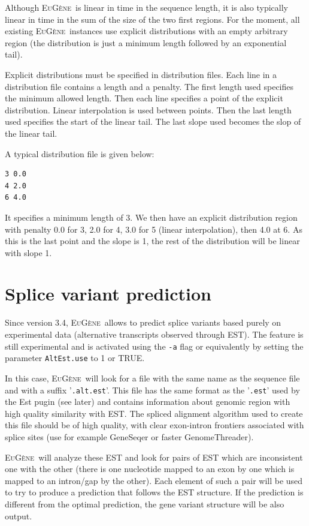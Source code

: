 \documentclass[a4paper,titlepage]{report}
\newcommand{\EuGene}{\textsc{EuG\`ene}}
\begin{document}
Although \EuGene\ is linear in time in the sequence length, it is also
typically linear in time in the sum of the size of the two first
regions. For the moment, all existing \EuGene\ instances use explicit
distributions with an empty arbitrary region (the distribution is just
a minimum length followed by an exponential tail).

Explicit distributions must be specified in distribution files. Each
line in a distribution file contains a length and a penalty. The first
length used specifies the minimum allowed length. Then each line
specifies a point of the explicit distribution. Linear interpolation
is used between points. Then the last length used specifies the start
of the linear tail. The last slope used becomes the slop of the linear
tail.

A
typical distribution file is given below:
\begin{Verbatim}
3 0.0
4 2.0
6 4.0
\end{Verbatim}

It specifies a minimum length of 3. We then have an explicit
distribution region with penalty 0.0 for 3, 2.0 for 4, 3.0 for 5
(linear interpolation), then 4.0 at 6. As this is the last point
and the slope is 1, the rest of the distribution will be linear
with slope 1.

\section{Splice variant prediction}

Since version 3.4, \EuGene\ allows to predict splice variants based purely on
experimental data (alternative transcripts observed through EST). The feature
is still experimental and is activated using the \texttt{-a} flag or 
equivalently by setting the parameter \texttt{AltEst.use} to 1 or TRUE.

In this case, \EuGene\ will look for a file with the same name as the sequence
file and with a suffix '\texttt{.alt.est}'. This file has the same format as
the '\texttt{.est}' used by the Est pugin (see later) and contains information
about genomic region with high quality similarity with EST. The spliced 
alignment algorithm used to create this file should be of high quality, 
with clear exon-intron frontiers associated with splice sites (use for example
GeneSeqer or faster GenomeThreader).

\EuGene\ will analyze these EST and look for pairs of EST which are inconsistent
one with the other (there is one nucleotide mapped to an exon by one which is 
mapped to an intron/gap by the other). Each element of such a pair will be used 
to try to produce a prediction that follows the EST structure. If the prediction
is different from the optimal prediction, the gene variant structure will be
also output.
\end{document}
